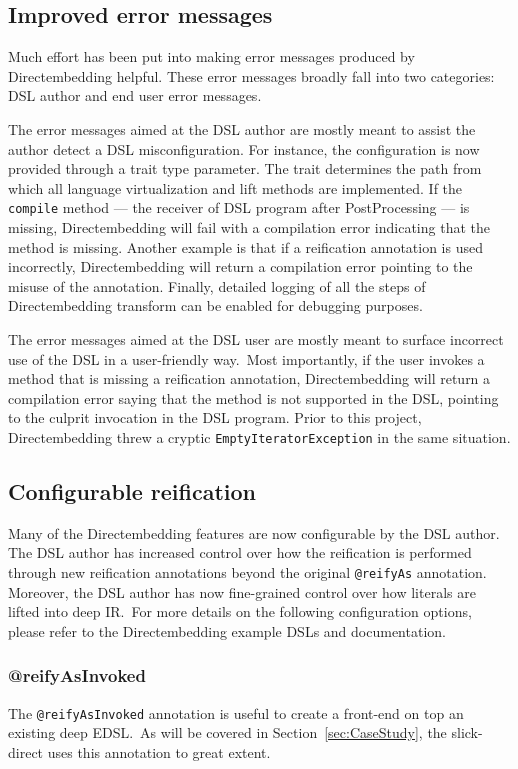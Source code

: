 \subsection{Improved error messages} %
\label{sub:Improvederrormessages}
Much effort has been put into making error messages produced by Directembedding helpful.
These error messages broadly fall into two categories: DSL author and end user error messages.

The error messages aimed at the DSL author are mostly meant to assist the author detect a DSL misconfiguration.
For instance, the configuration is now provided through a trait type parameter.
The trait determines the path from which all language virtualization and lift methods are implemented.
If the \texttt{compile} method --- the receiver of DSL program after PostProcessing ---  is missing, Directembedding will fail with a compilation error indicating that the method is missing.
Another example is that if a reification annotation is used incorrectly, Directembedding will return a compilation error pointing to the misuse of the annotation.
Finally, detailed logging of all the steps of Directembedding transform can be enabled for debugging purposes.

The error messages aimed at the DSL user are mostly meant to surface incorrect use of the DSL in a user-friendly way.\
Most importantly, if the user invokes a method that is missing a reification annotation, Directembedding will return a compilation error saying that the method is not supported in the DSL, pointing to the culprit invocation in the DSL program.
Prior to this project, Directembedding threw a cryptic \texttt{EmptyIteratorException} in the same situation.

\subsection{Configurable reification} %
\label{sub:Configurablereification}
Many of the Directembedding features are now configurable by the DSL author.
The DSL author has increased control over how the reification is performed through new reification annotations beyond the original \texttt{@reifyAs} annotation.
Moreover, the DSL author has now fine-grained control over how literals are lifted into deep IR.\
For more details on the following configuration options, please refer to the Directembedding example DSLs and documentation.

\subsubsection{@reifyAsInvoked} %
\label{sub:reifyAsInvoked}
The \texttt{@reifyAsInvoked} annotation is useful to create a front-end on top an existing deep EDSL.\
As will be covered in Section~\ref{sec:CaseStudy}, the slick-direct uses this annotation to great extent.

